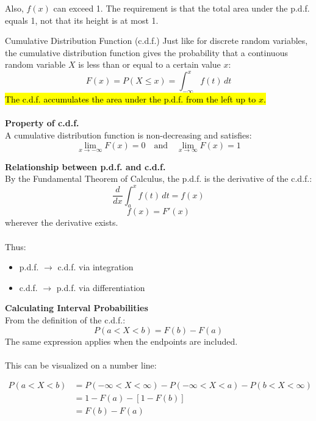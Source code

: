 ﻿\documentclass[12pt]{article}
\begin{document}
Also, \(f(x)\) can exceed 1. The requirement is that the total area under the p.d.f. equals 1, not that its height is at most 1.
\begin{definition}{Cumulative Distribution Function (c.d.f.)}
    Just like for discrete random variables, the cumulative distribution function gives the probability that a continuous random variable \(X\) is less than or equal to a certain value \(x\):
    \[
\boxed{F(x)=P(X\leq x)=\int_{-\infty}^{x}f(t)\,dt}
\]
\hl{The c.d.f. accumulates the area under the p.d.f. from the left up to \mbox{\(x\)}.}\\\\
\textbf{Property of c.d.f.}\\
A cumulative distribution function is non-decreasing and satisfies:
\[
\lim_{x \to -\infty} F(x) = 0 \quad \text{and} \quad \lim_{x \to \infty} F(x) = 1
\]
\end{definition}
\textbf{Relationship between p.d.f. and c.d.f.}\\
By the Fundamental Theorem of Calculus, the p.d.f. is the derivative of the c.d.f.:
\[
\frac{d}{dx}\int_a^x f(t)\,dt=f(x)
\]
\[
\boxed{f(x)=F'(x)}
\]
wherever the derivative exists.\\\\
Thus:
\begin{itemize}
    \item p.d.f. $\longrightarrow$ c.d.f. via integration
    \item c.d.f. $\longrightarrow$ p.d.f. via differentiation
\end{itemize}
\textbf{Calculating Interval Probabilities}\\
From the definition of the c.d.f.:
\[
\boxed{P(a<X<b)=F(b)-F(a)}
\]
The same expression applies when the endpoints are included.\\\\
This can be visualized on a number line:
\begin{center}
\end{center}
\[\begin{aligned}
P(a<X<b) &= P(-\infty < X < \infty) - P(-\infty < X <a) - P(b < X < \infty)\\
&= 1 - F(a) - [1-F(b)]\\
&= F(b) - F(a)
\end{aligned}\]
\end{document}
